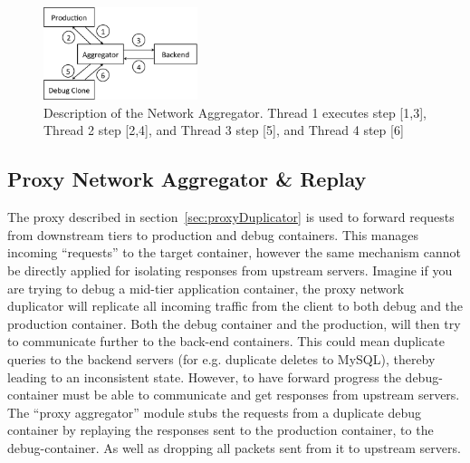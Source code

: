 
\begin{figure}[ht!]
	\begin{center}
		\includegraphics[width=0.4\textwidth]{figs/aggregator.pdf}
		\caption{Description of the Network Aggregator. Thread 1 executes step [1,3], Thread 2 step [2,4], and Thread 3 step [5], and Thread 4 step [6]}
		\label{fig:aggregator}
	\end{center}
\end{figure}

\vspace{-1mm}
\subsection{Proxy Network Aggregator \& Replay }
\label{sec:proxyAggregator}
The proxy described in section~\ref{sec:proxyDuplicator} is used to forward requests from downstream tiers to production and debug containers.
This manages incoming ``requests'' to the target container, however the same mechanism cannot be directly applied for isolating responses from upstream servers.
Imagine if you are trying to debug a mid-tier application container, the proxy network duplicator will replicate all incoming traffic from the client to both debug and the production container. 
Both the debug container and the production, will then try to communicate further to the back-end containers.
This could mean duplicate queries to the backend servers (for e.g. duplicate deletes to MySQL), thereby leading to an inconsistent state.
However, to have forward progress the debug-container must be able to communicate and get responses from upstream servers.
The ``proxy aggregator'' module stubs the requests from a duplicate debug container by replaying the responses sent to the production container, to the debug-container.
As well as dropping all packets sent from it to upstream servers.

